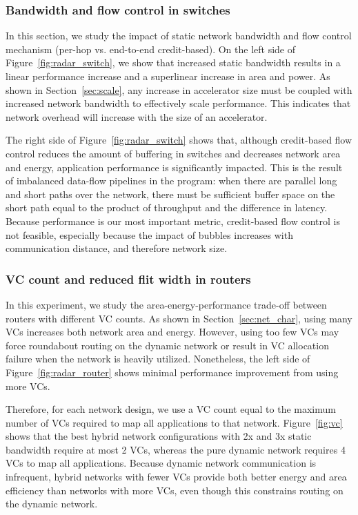 \subsubsection{Bandwidth and flow control in switches}

In this section, we study the impact of static network bandwidth and flow control mechanism (per-hop vs. end-to-end credit-based). 
On the left side of Figure~\ref{fig:radar_switch}, we show that increased static bandwidth results in a linear performance increase and a superlinear increase in area and power. 
As shown in Section~\ref{sec:scale}, any increase in accelerator size must be coupled with increased network bandwidth to effectively scale performance. 
This indicates that network overhead will increase with the size of an accelerator.

The right side of Figure~\ref{fig:radar_switch} shows that, although credit-based flow control reduces the amount of buffering in switches and decreases network area and energy, application performance is significantly impacted. 
This is the result of imbalanced data-flow pipelines in the program: when there are parallel long and short paths over the network, there must be sufficient buffer space on the short path equal to the product of throughput and the difference in latency. 
Because performance is our most important metric, credit-based flow control is not feasible, especially because the impact of bubbles increases with communication distance, and therefore network size.

\subsubsection{VC count and reduced flit width in routers}
In this experiment, we study the area-energy-performance trade-off between routers with different VC counts. As shown
in Section~\ref{sec:net_char}, using many VCs increases both network area and energy.
However, using too few VCs may force roundabout routing on the dynamic network or result in VC allocation failure when the network is heavily utilized.
Nonetheless, the left side of Figure~\ref{fig:radar_router} shows minimal performance improvement from using more VCs. 

Therefore, for each network design, we use a VC count equal to the maximum number of VCs required to map all applications to that network. 
Figure~\ref{fig:vc} shows that the best hybrid network configurations with 2x and 3x static bandwidth require at most 2 VCs, whereas the pure dynamic network requires 4 VCs to map all applications.
Because dynamic network communication is infrequent, hybrid networks with fewer VCs provide both better energy and area efficiency than networks with more VCs, even though this constrains routing on the dynamic network.


